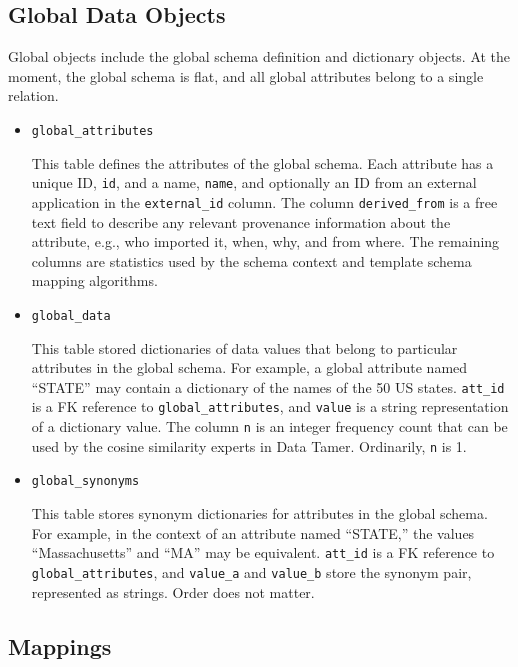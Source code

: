 \subsection{Global Data Objects}

Global objects include the global schema definition and dictionary objects.  At the moment, the global schema is flat, and all global attributes belong to a single relation.

\begin{itemize}

\item \texttt{global\_attributes}

This table defines the attributes of the global schema.  Each attribute has a unique ID, \texttt{id}, and a name, \texttt{name}, and optionally an ID from an external application in the \texttt{external\_id} column.  The column \texttt{derived\_from} is a free text field to describe any relevant provenance information about the attribute, e.g., who imported it, when, why, and from where.  The remaining columns are statistics used by the schema context and template schema mapping algorithms.

\item \texttt{global\_data}

This table stored dictionaries of data values that belong to particular attributes in the global schema.  For example, a global attribute named ``STATE'' may contain a dictionary of the names of the 50 US states.  \texttt{att\_id} is a FK reference to \texttt{global\_attributes}, and \texttt{value} is a string representation of a dictionary value.  The column \texttt{n} is an integer frequency count that can be used by the cosine similarity experts in Data Tamer.  Ordinarily, \texttt{n} is 1.

\item \texttt{global\_synonyms}

This table stores synonym dictionaries for attributes in the global schema.  For example, in the context of an attribute named ``STATE,'' the values ``Massachusetts'' and ``MA'' may be equivalent.  \texttt{att\_id} is a FK reference to \texttt{global\_attributes}, and \texttt{value\_a} and \texttt{value\_b} store the synonym pair, represented as strings.  Order does not matter.

\end{itemize}


\subsection{Mappings}

